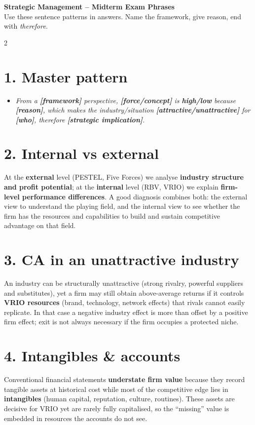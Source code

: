 \documentclass[8pt,landscape,a4paper]{article}
\begin{document}
\small
\begin{center}
{\large\bfseries\color{eublue} Strategic Management -- Midterm Exam Phrases}\\[0.2em]
\footnotesize Use these sentence patterns in answers. Name the framework, give reason, end with \emph{therefore}.
\end{center}
\vspace{0.3em}

\begin{multicols}{2}

\section*{\color{eublue}1. Master pattern}
\begin{itemize}
\item \emph{From a \textbf{[framework]} perspective, \textbf{[force/concept]} is \textbf{high/low} because \textbf{[reason]}, which makes the industry/situation \textbf{[attractive/unattractive]} for \textbf{[who]}, therefore \textbf{[strategic implication]}.}
\end{itemize}

\section*{\color{eublue}2. Internal vs external}
At the \textbf{external} level (PESTEL, Five Forces) we analyse \textbf{industry structure and profit potential}; at the \textbf{internal} level (RBV, VRIO) we explain \textbf{firm-level performance differences}. A good diagnosis combines both: the external view to understand the playing field, and the internal view to see whether the firm has the resources and capabilities to build and sustain competitive advantage on that field.

\section*{\color{eublue}3. CA in an unattractive industry}
An industry can be structurally unattractive (strong rivalry, powerful suppliers and substitutes), yet a firm may still obtain above-average returns if it controls \textbf{VRIO resources} (brand, technology, network effects) that rivals cannot easily replicate. In that case a negative industry effect is more than offset by a positive firm effect; exit is not always necessary if the firm occupies a protected niche.

\section*{\color{eublue}4. Intangibles \& accounts}
Conventional financial statements \textbf{understate firm value} because they record tangible assets at historical cost while most of the competitive edge lies in \textbf{intangibles} (human capital, reputation, culture, routines). These assets are decisive for VRIO yet are rarely fully capitalised, so the ``missing'' value is embedded in resources the accounts do not see.


\end{multicols}
\end{document}

